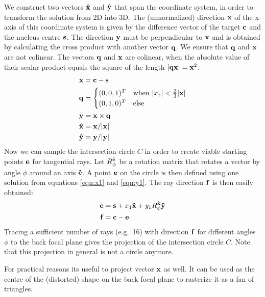 We construct two vectors $\mathbf{\hat{x}}$ and $\mathbf{\hat{y}}$ that span the coordinate
system, in order to transform the solution from 2D into 3D. The
(unnormalized) direction $\mathbf{x}$ of the x-axis of this coordinate system
is given by the difference vector of the target $\mathbf{c}$ and the nucleus
centre $\mathbf{s}$. The direction $\mathbf{y}$ must be perpendicular to $\mathbf{x}$ and is
obtained by calculating the cross product with another vector $\mathbf{q}$.
We ensure that $\mathbf{q}$ and $\mathbf{x}$ are not colinear. The vectors $\mathbf{q}$ and
$\mathbf{x}$ are colinear, when the absolute value of their scalar product
equals the square of the length $\mathopen| \mathbf{q}\mathbf{x} \mathclose|=\mathbf{x}^2$.
\begin{align}
  \mathbf{x}&=\mathbf{c}-\mathbf{s}\\
  \mathbf{q}&=\begin{cases}
    (0,0,1)^T & \textrm{when}\ \mathopen| x_z \mathclose|<\frac{2}{3}\mathopen| \mathbf{x} \mathclose|\\
    (0,1,0)^T & \textrm{else}
  \end{cases}\\
  \mathbf{y}&=\mathbf{x}\times\mathbf{q} \\
  \mathbf{\hat{x}}&=\mathbf{x}/\mathopen| \mathbf{x} \mathclose|\\
  \mathbf{\hat{y}}&=\mathbf{y}/\mathopen| \mathbf{y} \mathclose|
\end{align}
Now we can sample the intersection circle $C$ in order to create
viable starting points $\mathbf{e}$ for tangential rays.  Let $R_\phi^{\mathbf{\hat{c}}}$ be
a rotation matrix that rotates a vector by angle $\phi$ around an axis
$\mathbf{\hat{c}}$. A point $\mathbf{e}$ on the circle is then defined using one solution
from equations \ref{eqn:x1} and \ref{eqn:y1}. The ray direction $\mathbf{f}$
is then easily obtained:
\begin{align}
  \mathbf{e}&=\mathbf{s}+x_1\mathbf{\hat{x}}+y_1R_\phi^{\mathbf{\hat{x}}}\mathbf{\hat{y}}\\
  \mathbf{f}&=\mathbf{c}-\mathbf{e}.
\end{align}
Tracing a sufficient number of rays (e.g.\ 16) with direction $\mathbf{f}$ for
different angles $\phi$ to the back focal plane gives the projection
of the intersection circle $C$. Note that this projection in general
is not a circle anymore.

For practical reasons its useful to project vector $\mathbf{x}$ as well. It
can be used as the centre of the (distorted) shape on the back focal
plane to rasterize it as a fan of triangles.



